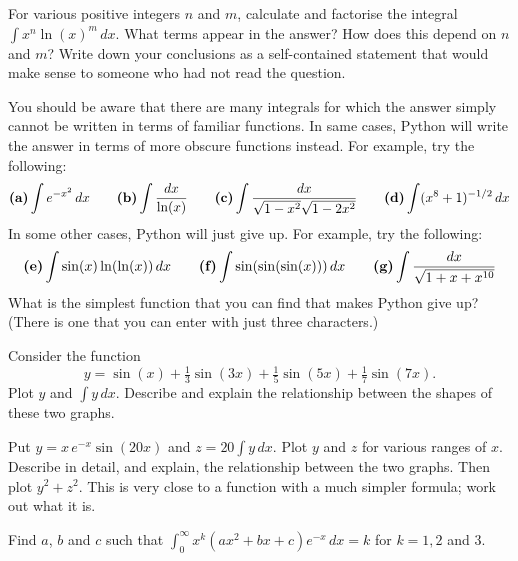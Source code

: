 \documentclass[a4paper,10pt]{amsbook}
\begin{document}
\begin{exercise}
 For various positive integers $n$ and $m$, calculate and
 factorise the integral $\int x^n\ln(x)^m\,dx$.  What terms
 appear in the answer?  How does this depend on $n$ and $m$?
 Write down your conclusions as a self-contained statement
 that would make sense to someone who had not read the
 question. 
\end{exercise}

\begin{exercise}
 You should be aware that there are many integrals for which
 the answer simply cannot be written in terms of familiar
 functions.  In same cases, Python will write the answer in
 terms of more obscure functions instead.  For example, try
 the following:
 \[ \text{\bf (a)} \int e^{-x^2}\,dx \hspace{2em}
    \text{\bf (b)} \int \frac{dx}{\ln(x)} \hspace{2em}
    \text{\bf (c)} \int \frac{dx}{\sqrt{1-x^2}\sqrt{1-2x^2}} \hspace{2em}
    \text{\bf (d)} \int (x^8+1)^{-1/2}\,dx
 \]
 In some other cases, Python will just give up.  For example,
 try the following:
 \[ \text{\bf (e)} \int \sin(x)\ln(\ln(x))\,dx \hspace{2em}
    \text{\bf (f)} \int \sin(\sin(\sin(x)))\,dx \hspace{2em}
    \text{\bf (g)} \int \frac{dx}{\sqrt{1+x+x^{10}}}
 \]
 What is the simplest function that you can find that makes
 Python give up?  (There is one that you can enter with just
 three characters.)
\end{exercise}

\begin{exercise}
 Consider the function
 \[ y = \sin(x) + \tfrac{1}{3}\sin(3x) +
        \tfrac{1}{5}\sin(5x) + \tfrac{1}{7}\sin(7x).
 \]
 Plot $y$ and $\int y\,dx$.  Describe and explain the
 relationship between the shapes of these two graphs.
\end{exercise}

\begin{exercise}
 Put $y=x\,e^{-x}\sin(20x)$ and $z=20 \int y\,dx$.  Plot $y$ and
 $z$ for various ranges of $x$.  Describe in detail, and
 explain, the relationship between the two graphs.  Then
 plot $y^2+z^2$.  This is very close to a function with a
 much simpler formula; work out what it is.
\end{exercise}

\begin{exercise}
 Find $a$, $b$ and $c$ such that
 $\int_0^\infty x^k(ax^2+bx+c)e^{-x}\,dx=k$ for $k=1,2$ and $3$.
\end{exercise}
\end{document}
